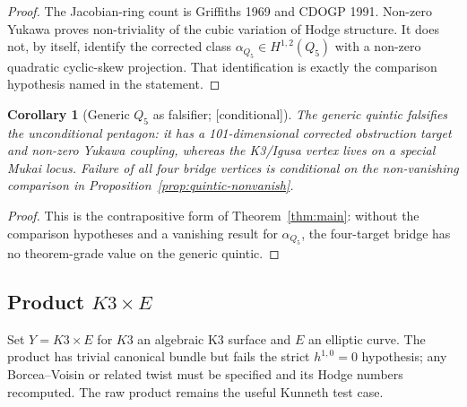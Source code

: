 \documentclass[11pt,reqno]{amsart}
\theoremstyle{plain}
\newtheorem{corollary}[theorem]{Corollary}
\theoremstyle{definition}
\theoremstyle{remark}
\providecommand{\ClaimStatusConditional}{\textnormal{[conditional]}}
\begin{document}
\begin{proof}
The Jacobian-ring count is Griffiths 1969 and CDOGP 1991. Non-zero
Yukawa proves non-triviality of the cubic variation of Hodge structure.
It does not, by itself, identify the corrected class
$\alpha_{Q_5}\in H^{1,2}(Q_5)$ with a non-zero quadratic
cyclic-skew projection. That identification is exactly the comparison
hypothesis named in the statement.
\end{proof}

\begin{corollary}[Generic $Q_5$ as falsifier; \ClaimStatusConditional]
\label{cor:quintic-fails}
The generic quintic falsifies the unconditional pentagon: it has a
101-dimensional corrected obstruction target and non-zero Yukawa
coupling, whereas the K3/Igusa vertex lives on a special Mukai locus.
Failure of all four bridge vertices is conditional on the non-vanishing
comparison in Proposition~\ref{prop:quintic-nonvanish}.
\end{corollary}

\begin{proof}
This is the contrapositive form of Theorem~\ref{thm:main}: without the
comparison hypotheses and a vanishing result for $\alpha_{Q_5}$, the
four-target bridge has no theorem-grade value on the generic quintic.
\end{proof}

\subsection{Product $K3 \times E$}
Set $Y = K3 \times E$ for $K3$ an algebraic K3 surface and $E$ an elliptic curve. The product has trivial canonical bundle but fails the strict $h^{1,0}=0$ hypothesis; any Borcea--Voisin or related twist must be specified and its Hodge numbers recomputed. The raw product remains the useful Kunneth test case.
\end{document}
